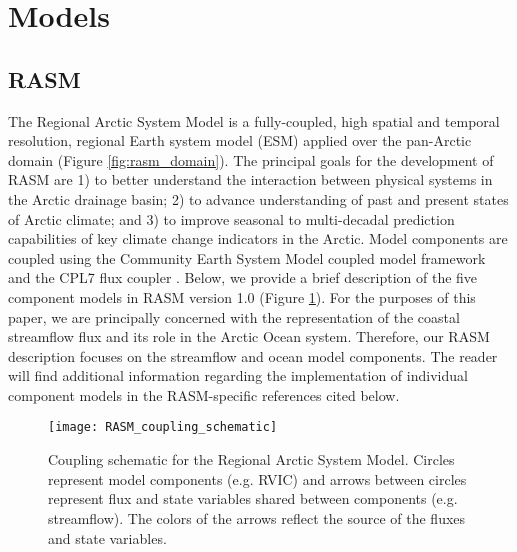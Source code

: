 \section{Models}
\label{sec:models_ch4}

\subsection{RASM}
\label{sec:rasm}
The Regional Arctic System Model is a fully-coupled, high spatial and temporal resolution, regional Earth system model (ESM) applied over the pan-Arctic domain (Figure \ref{fig:rasm_domain}).
The principal goals for the development of RASM are 1) to better understand the interaction between physical systems in the Arctic drainage basin; 2) to advance understanding of past and present states of Arctic climate; and 3) to improve seasonal to multi-decadal prediction capabilities of key climate change indicators in the Arctic.
Model components are coupled using the Community Earth System Model \citep[CESM; ][]{Hurrell_2013} coupled model framework and the CPL7 flux coupler \citep{Craig_2012}.
Below, we provide a brief description of the five component models in RASM version 1.0 (Figure \ref{fig:rasm_coupling_schematic}).
For the purposes of this paper, we are principally concerned with the representation of the coastal streamflow flux and its role in the Arctic Ocean system.
Therefore, our RASM description focuses on the streamflow and ocean model components.
The reader will find additional information regarding the implementation of individual component models in the RASM-specific references cited below.

\begin{figure}
    \centering
    \texttt{[image: RASM\_coupling\_schematic]}
    \caption{Coupling schematic for the Regional Arctic System Model. Circles represent model components (e.g. RVIC) and arrows between circles represent flux and state variables shared between components (e.g. streamflow). The colors of the arrows reflect the source of the fluxes and state variables.}
    \label{fig:rasm_coupling_schematic}
\end{figure}

